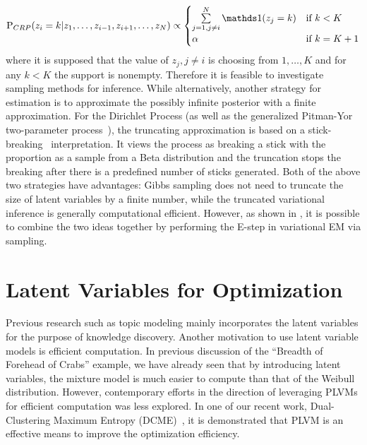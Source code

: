 \begin{align}
  \P_{CRP}(z_i = k | z_1, \dots, z_{i-1}, z_{i+1}, \dots, z_N)
    \propto
      \begin{cases}
        \sum\limits_{j = 1, j \neq i}^N \indct( z_j = k )
        & \text{if $k < K$} \\
        \alpha
        & \text{if $k = K + 1$}
      \end{cases}
\end{align}
%
where it is supposed that the value of $z_j, j \neq i$ is choosing from $1,
\dots, K$  and for any $k < K$ the support is nonempty. Therefore it is feasible
to investigate sampling methods for inference. While alternatively, another
strategy for estimation is to approximate the possibly infinite posterior with a
finite approximation. For the Dirichlet Process (as well as the generalized
Pitman-Yor two-parameter process~\cite{pitman1997two}), the truncating
approximation is based on a stick-breaking~\cite{ishwaran2011gibbs}
interpretation. It views the process as breaking a stick with the proportion as
a sample from a Beta distribution and the truncation stops the breaking after
there is a predefined number of sticks generated. Both of the above two
strategies have advantages: Gibbs sampling does not need to truncate the size of
latent variables by a finite number, while the truncated variational inference
is generally computational efficient. However, as shown in
\cite{wang2012truncation}, it is possible to combine the two ideas together by
performing the E-step in variational EM via sampling.

\section{Latent Variables for Optimization}

Previous research such as topic modeling mainly incorporates the latent
variables for the purpose of knowledge discovery. Another motivation to use
latent variable models is efficient computation. In previous discussion of the
``Breadth of Forehead of Crabs'' example, we have already seen that by
introducing latent variables, the mixture model is much easier to compute than
that of the Weibull distribution. However, contemporary efforts in the direction
of leveraging PLVMs for efficient computation was less explored. In one of our
recent work, Dual-Clustering Maximum Entropy (DCME)~\cite{wang2016dcme}, it is
demonstrated that PLVM is an effective means to improve the optimization
efficiency.

